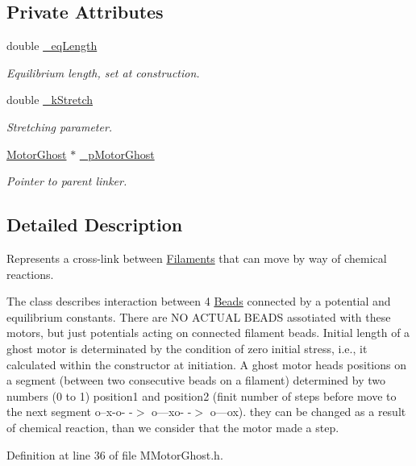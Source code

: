 \subsection*{Private Attributes}
\begin{DoxyCompactItemize}
\item 
double \hyperlink{classMMotorGhost_a1cd86ed356e7b00fbf30de29824e769f}{\+\_\+eq\+Length}
\begin{DoxyCompactList}\small\item\em Equilibrium length, set at construction. \end{DoxyCompactList}\item 
double \hyperlink{classMMotorGhost_ac4dd3bd5770e8e7793b1f1a8413ab9e6}{\+\_\+k\+Stretch}
\begin{DoxyCompactList}\small\item\em Stretching parameter. \end{DoxyCompactList}\item 
\hyperlink{classMotorGhost}{Motor\+Ghost} $\ast$ \hyperlink{classMMotorGhost_a3c22024539ed93368cd83cda70e075a4}{\+\_\+p\+Motor\+Ghost}
\begin{DoxyCompactList}\small\item\em Pointer to parent linker. \end{DoxyCompactList}\end{DoxyCompactItemize}


\subsection{Detailed Description}
Represents a cross-\/link between \hyperlink{classFilament}{Filaments} that can move by way of chemical reactions. 

The class describes interaction between 4 \hyperlink{classBead}{Beads} connected by a potential and equilibrium constants. There are N\+O A\+C\+T\+U\+A\+L B\+E\+A\+D\+S assotiated with these motors, but just potentials acting on connected filament beads. Initial length of a ghost motor is determinated by the condition of zero initial stress, i.\+e., it calculated within the constructor at initiation. A ghost motor heads positions on a segment (between two consecutive beads on a filament) determined by two numbers (0 to 1) position1 and position2 (finit number of steps before move to the next segment o--x-\/o-\/ -\/$>$ o---xo-\/ -\/$>$ o---ox). they can be changed as a result of chemical reaction, than we consider that the motor made a step. 

Definition at line 36 of file M\+Motor\+Ghost.\+h.



